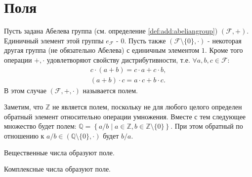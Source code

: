 \section{Поля}
\begin{definition}
  Пусть задана Абелева группа (см. определение
  \ref{def:add:abeliangroup})  
  $(\mathcal{F}, +)$. Единичный элемент этой группы $e_\mathcal{F}$ -
  $0$. Пусть также $(\mathcal{F} \setminus \{0\}, \cdot)$ - некоторая
  другая группа (не
  обязательно Абелева) с единичным элементом $1$. Кроме того операции
  $+,\cdot$ удовлетворяют свойству дистрибутивности, т.е. $\forall
  a,b,c \in \mathcal{F}$:
  \begin{eqnarray}
  c \cdot \left(a + b\right) = c \cdot a + c \cdot b,
  \nonumber \\
  \left(a + b\right) \cdot c = a \cdot c + b \cdot c.
  \nonumber
  \end{eqnarray}
  В этом случае $(\mathcal{F}, +, \cdot)$ называется полем.
  \label{def:field}
\end{definition}

\begin{example}
  Заметим, что $\mathbb{Z}$ не является полем, поскольку не для любого
  целого определен обратный элемент относительно операции умножения. 
  Вместе с тем следующее множество будет полем: $\mathbb{Q} =
  \left\{a/b \mid a \in \mathbb{Z}, b \in 
  \mathbb{Z}\setminus\{0\}\right\}$. При этом обратный по отношению к
  $a/b \in \left(\mathbb{Q}\setminus\{0\}, \cdot\right)$ будет $b/a$.
  \label{ex:field_q}
\end{example}

\begin{example}
  Вещественные числа образуют поле.
  \label{ex:field_r}
\end{example}

\begin{example}
  Комплексные числа образуют поле.
  \label{ex:field_c}
\end{example}
